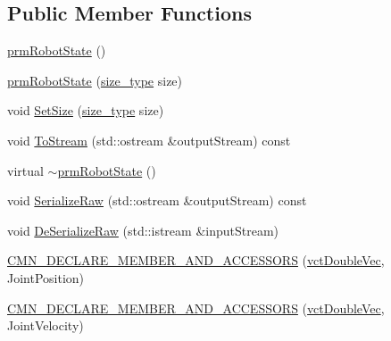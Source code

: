 \subsection*{Public Member Functions}
\begin{DoxyCompactItemize}
\item 
\hyperlink{classprm_robot_state_a4c688de0cb879c541ac8a8aab59715fe}{prm\+Robot\+State} ()
\item 
\hyperlink{classprm_robot_state_a08475253ccadaab8c01f04fd113e20a7}{prm\+Robot\+State} (\hyperlink{classprm_robot_state_a2cf2c739d5b3cdd3f9d44e2878183d90}{size\+\_\+type} size)
\item 
void \hyperlink{classprm_robot_state_a2d4ea78a7658becc5e57988eaf4cacd2}{Set\+Size} (\hyperlink{classprm_robot_state_a2cf2c739d5b3cdd3f9d44e2878183d90}{size\+\_\+type} size)
\item 
void \hyperlink{classprm_robot_state_a52834514857c906ed8f11a71f7e11123}{To\+Stream} (std\+::ostream \&output\+Stream) const 
\item 
virtual \hyperlink{classprm_robot_state_aa14bb8c0d12806e4db28408ea0f89e1a}{$\sim$prm\+Robot\+State} ()
\item 
void \hyperlink{classprm_robot_state_a19f7827d565843680215b6e544b183dd}{Serialize\+Raw} (std\+::ostream \&output\+Stream) const 
\item 
void \hyperlink{classprm_robot_state_a86ed0b0af1d86c53bfa3dc32b770d03d}{De\+Serialize\+Raw} (std\+::istream \&input\+Stream)
\end{DoxyCompactItemize}
{\bf }\par
\begin{DoxyCompactItemize}
\item 
\hyperlink{classprm_robot_state_aa03ddcc1beb0e0f41210e8e3fa4483cf}{C\+M\+N\+\_\+\+D\+E\+C\+L\+A\+R\+E\+\_\+\+M\+E\+M\+B\+E\+R\+\_\+\+A\+N\+D\+\_\+\+A\+C\+C\+E\+S\+S\+O\+R\+S} (\hyperlink{vct_dynamic_vector_types_8h_ade4b3068c86fb88f41af2e5187e491c2}{vct\+Double\+Vec}, Joint\+Position)
\end{DoxyCompactItemize}

{\bf }\par
\begin{DoxyCompactItemize}
\item 
\hyperlink{classprm_robot_state_a30b03328a0d3b60ef0c5d2624e2fae31}{C\+M\+N\+\_\+\+D\+E\+C\+L\+A\+R\+E\+\_\+\+M\+E\+M\+B\+E\+R\+\_\+\+A\+N\+D\+\_\+\+A\+C\+C\+E\+S\+S\+O\+R\+S} (\hyperlink{vct_dynamic_vector_types_8h_ade4b3068c86fb88f41af2e5187e491c2}{vct\+Double\+Vec}, Joint\+Velocity)
\end{DoxyCompactItemize}

